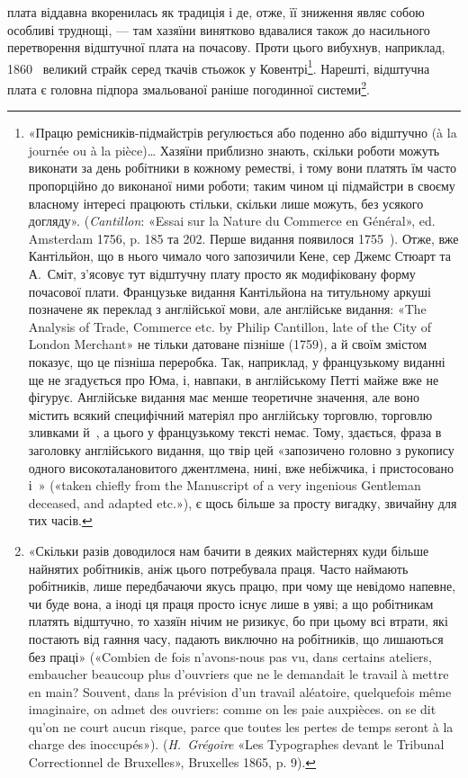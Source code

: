 плата віддавна вкоренилась як традиція і де, отже, її зниження
являє собою особливі труднощі, — там хазяїни винятково вдавалися
також до насильного перетворення відштучної плата на почасову.
Проти цього вибухнув, наприклад, 1860~ великий страйк
серед ткачів стьожок у Ковентрі\footnote{
«Працю ремісників-підмайстрів реґулюється або поденно або
відштучно (à la journée ou à la pièce)\dots{} Хазяїни приблизно знають,
скільки роботи можуть виконати за день робітники в кожному реместві,
і тому вони платять їм часто пропорційно до виконаної ними роботи;
таким чином ці підмайстри в своєму власному інтересі працюють стільки,
скільки лише можуть, без усякого догляду». (\emph{Cantillon}: «Essai sur la
Nature du Commerce en Général», ed. Amsterdam 1756, p. 185 та 202. Перше видання появилося 1755~). Отже, вже Кантільйон, що в нього
чимало чого запозичили Кене, сер Джемс Стюарт та А.~Сміт, з'ясовує
тут відштучну плату просто як модифіковану форму почасової плати.
Французьке видання Кантільйона на титульному аркуші позначене як
переклад з англійської мови, але англійське видання: «The Analysis
of Trade, Commerce etc. by Philip Cantillon, late of the City of London
Merchant» не тільки датоване пізніше (1759), а й своїм змістом показує,
що це пізніша переробка. Так, наприклад, у французькому виданні ще
не згадується про Юма, і, навпаки, в англійському Петті майже вже не
фігурує. Англійське видання має менше теоретичне значення, але воно
містить всякий специфічний матеріял про англійську торговлю, торговлю
зливками й~, а цього у французькому тексті немає. Тому, здається,
фраза в заголовку англійського видання, що твір цей «запозичено головно
з рукопису одного високоталановитого джентлмена, нині, вже небіжчика,
і пристосовано і~» («taken chiefly from the Manuscript of
a very ingenious Gentleman deceased, and adapted etc.»), є щось більше
за просту вигадку, звичайну для тих часів.
}. Нарешті, відштучна плата
є головна підпора змальованої раніше погодинної системи\footnote{
«Скільки разів доводилося нам бачити в деяких майстернях куди
більше найнятих робітників, аніж цього потребувала праця. Часто наймають
робітників, лише передбачаючи якусь працю, при чому ще невідомо
напевне, чи буде вона, а іноді ця праця просто існує лише в уяві;
а що робітникам платять відштучно, то хазяїн нічим не ризикує, бо при
цьому всі втрати, які постають від гаяння часу, падають виключно на
робітників, що лишаються без праці» («Combien de fois n’avons-nous
pas vu, dans certains ateliers, embaucher beaucoup plus d’ouvriers que
ne le demandait le travail à mettre en main? Souvent, dans la prévision
d’un travail aléatoire, quelquefois même imaginaire, on admet des ouvriers:
comme on les paie auxpièces. on se dit qu’on ne court aucun risque, parce
que toutes les pertes de temps seront à la charge des inoccupés»). (\emph{H.~Grégoire}
«Les Typographes devant le Tribunal Correctionnel de Bruxelles»,
Bruxelles 1865, p. 9).
}.

